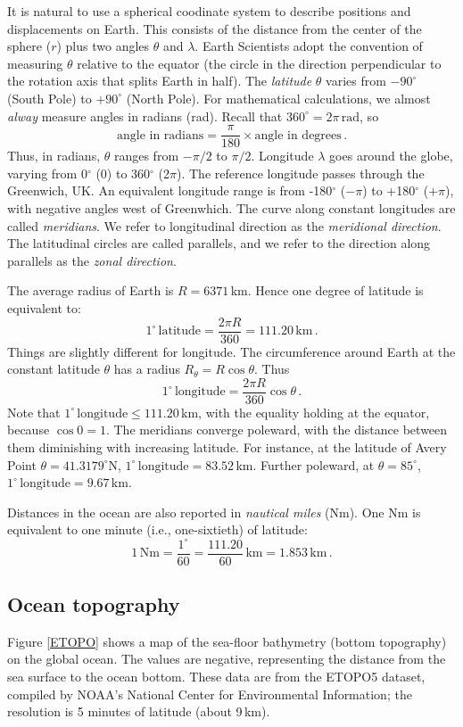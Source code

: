 \documentclass[11pt]{article}
\newcommand{\per}{\,.}
\def\beq{\begin{equation}}
\def\eeq{\end{equation}}
\begin{document}
It is natural to use a spherical coodinate system to describe positions and displacements on Earth.
This consists of the distance from the center of the sphere ($r$) plus two angles $\theta$
and $\lambda$.  Earth Scientists adopt the convention of measuring $\theta$ relative to the
equator (the circle in the direction perpendicular to the rotation axis that splits Earth in half). The \emph{latitude} $\theta$ varies from $-90^{\circ}$ (South Pole) to
$+90^{\circ}$ (North Pole). For mathematical calculations, we almost \emph{alway} measure angles
in radians (rad). Recall that $360^\circ = 2\pi\,\text{rad}$, so
\beq
\text{angle in radians} =  \frac{\pi}{180} \times \text{angle in degrees} \per
\eeq
Thus, in radians, $\theta$ ranges from $-\pi/2$ to $\pi/2$. Longitude $\lambda$ goes
around the globe, varying from 0$^\circ$ (0) to 360$^\circ$ (2$\pi$). The reference longitude
passes through the Greenwich, UK. An equivalent longitude range is from -180$^\circ$ ($-\pi$) to
+180$^\circ$ ($+\pi$), with negative angles west of Greenwhich. The curve along
constant longitudes are called \emph{meridians}. We refer to longitudinal direction as
the \emph{meridional direction}. The latitudinal circles are called {parallels}, and we refer to
the direction along parallels as the \emph{zonal direction}.

The average radius of Earth is $R = 6371$\,km. Hence one degree of latitude is
equivalent to:
\beq
1^\circ\, \text{latitude} = \frac{2\pi R}{360} = 111.20\,\text{km}\per
\eeq
Things are slightly different for longitude. The circumference
around Earth at the constant latitude $\theta$ has a radius $R_\theta = R \cos\theta$. Thus
\beq
1^\circ\, \text{longitude} = \frac{2\pi R}{360}\cos\theta\per
\eeq
Note that  $1^\circ\, \text{longitude}
\le 111.20$\,km, with the equality holding at the equator, because
$\cos 0 = 1$. The meridians converge poleward, with the distance between them
diminishing with increasing latitude. For instance, at the latitude of Avery Point $\theta = 41.3179^\circ$N, $1^\circ\, \text{longitude} = 83.52$\,km. Further poleward, at $\theta = 85^\circ$,
 $1^\circ\, \text{longitude} = 9.67$\,km.

Distances in the ocean are also reported in \emph{nautical miles} (Nm). One Nm is equivalent
to one minute (i.e., one-sixtieth) of latitude:
\beq
1\,\text{Nm} = \frac{1^\circ}{60} = \frac{111.20}{60} \,\text{km} = 1.853\,\text{km}\per
\eeq

\subsection{Ocean topography}
Figure \ref{ETOPO} shows a map of the sea-floor bathymetry (bottom topography)
on the global ocean. The values are negative, representing the distance from the sea surface to the
ocean bottom. These data are from the ETOPO5 dataset, compiled by NOAA's National Center for Environmental Information; the resolution is 5 minutes of latitude (about 9\,km).
\end{document}
